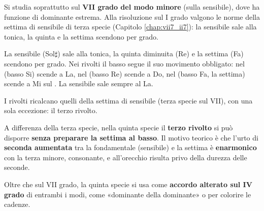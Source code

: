 Si studia soprattutto sul \textbf{VII grado del modo minore} (sulla sensibile), dove ha funzione di dominante estrema. Alla risoluzione sul I grado valgono le norme della settima di sensibile di terza specie (Capitolo \ref{chap:vii7_ii7}): la sensibile sale alla tonica, la quinta e la settima scendono per grado.

\begin{esempio}
	\label{ex:vii_dim7}
	La sensibile (Sol$\sharp$) sale alla tonica, la quinta diminuita (Re) e la settima (Fa) scendono per grado.
	Nei rivolti il basso segue il suo movimento obbligato: nel  (basso Si) scende a La, nel  (basso Re) scende a Do, nel  (basso Fa, la settima) scende a Mi sul . La sensibile sale sempre al La.
\end{esempio}

I rivolti ricalcano quelli della settima di sensibile (terza specie sul VII), con una sola eccezione: il terzo rivolto.

\begin{osservazione}
	\label{oss:dim7_terzo_rivolto}
	A differenza della terza specie, nella quinta specie il \textbf{terzo rivolto} si può disporre \textbf{senza preparare la settima al basso}. Il motivo teorico è che l'urto di \textbf{seconda aumentata} tra la fondamentale (sensibile) e la settima è \textbf{enarmonico} con la terza minore, consonante, e all'orecchio risulta privo della durezza delle seconde.
\end{osservazione}

Oltre che sul VII grado, la quinta specie si usa come \textbf{accordo alterato sul IV grado} di entrambi i modi, come «dominante della dominante» o per colorire le cadenze.
